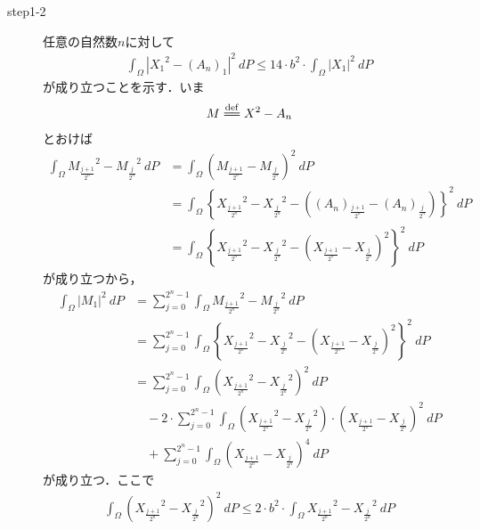 \begin{sketch}
\begin{description}
			\item[step1-2]
				任意の自然数$n$に対して
				\begin{align}
					\int_\Omega \left|{X_{1}}^{2} - (A_{n})_{1}\right|^{2}\ dP
					\leq 14 \cdot b^{2} \cdot \int_\Omega \left|X_{1}\right|^{2}\ dP
				\end{align}
				が成り立つことを示す．いま
				\begin{align}
					M \defeq X^{2} - A_{n}
				\end{align}
				とおけば
				\begin{align}
					\int_\Omega {M_{\frac{j+1}{2^n}}}^{2} - {M_{\frac{j}{2^n}}}^{2}\ dP
					&= \int_\Omega \left(M_{\frac{j+1}{2^n}} - M_{\frac{j}{2^n}} \right)^{2}\ dP \\
					&= \int_\Omega \left\{ {X_{\frac{j+1}{2^n}}}^{2} - {X_{\frac{j}{2^n}}}^{2} -
					\left((A_{n})_{\frac{j+1}{2^n}} - (A_{n})_{\frac{j}{2^n}}\right) \right\}^{2}\ dP \\
					&= \int_\Omega \left\{ {X_{\frac{j+1}{2^n}}}^{2} - {X_{\frac{j}{2^n}}}^{2} -
					\left(X_{\frac{j+1}{2^n}} - X_{\frac{j}{2^n}}\right)^2 \right\}^{2}\ dP
				\end{align}
				が成り立つから，
				\begin{align}
					\int_\Omega \left|M_{1}\right|^{2}\ dP
					&= \sum_{j=0}^{2^n-1} \int_\Omega {M_{\frac{j+1}{2^n}}}^{2} - {M_{\frac{j}{2^n}}}^{2}\ dP \\
					&= \sum_{j=0}^{2^n-1} \int_\Omega \left\{ {X_{\frac{j+1}{2^n}}}^{2} - {X_{\frac{j}{2^n}}}^{2} -
					\left(X_{\frac{j+1}{2^n}} - X_{\frac{j}{2^n}}\right)^2 \right\}^2\ dP \\
					&= \sum_{j=0}^{2^n-1} \int_\Omega \left( {X_{\frac{j+1}{2^n}}}^{2} - {X_{\frac{j}{2^n}}}^{2} \right)^{2}\ dP \\
						&\quad - 2 \cdot \sum_{j=0}^{2^n-1} \int_\Omega \left( {X_{\frac{j+1}{2^n}}}^{2} - {X_{\frac{j}{2^n}}}^{2} \right) \cdot \left(X_{\frac{j+1}{2^n}} - X_{\frac{j}{2^n}}\right)^{2}\ dP \\
						&\quad + \sum_{j=0}^{2^n-1} \int_\Omega \left(X_{\frac{j+1}{2^n}} - X_{\frac{j}{2^n}}\right)^{4}\ dP
					\label{fom:thm_decomposition_of_square_integrable_martingales_1}
				\end{align}
				が成り立つ．ここで
				\begin{align}
					\int_\Omega \left( {X_{\frac{j+1}{2^n}}}^{2} - {X_{\frac{j}{2^n}}}^{2} \right)^{2}\ dP
					\leq 2 \cdot b^{2} \cdot \int_\Omega {X_{\frac{j+1}{2^n}}}^{2} - {X_{\frac{j}{2^n}}}^{2}\ dP
				\end{align}

\end{description}
\end{sketch}
